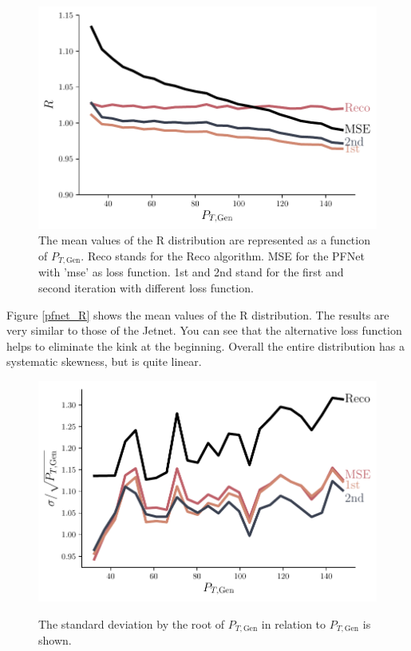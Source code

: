 \documentclass[12pt, a4paper]{thesis}
\begin{document}
\begin{figure}[htbp]
\centering
\includegraphics[width=.9\linewidth]{../images/pfnet_R.pdf}
\caption{\label{fig:orgfd0f576}
The mean values of the R distribution are represented as a function of \(P_{T, \text{Gen}}\). Reco stands for the Reco algorithm. MSE for the PFNet with 'mse' as loss function. 1st and 2nd stand for the first and second iteration with different loss function.}
\end{figure}

Figure \ref{pfnet_R} shows the mean values of the R
distribution. The results are very similar to those of the Jetnet. You
can see that the alternative loss function helps to eliminate the kink
at the beginning.  Overall the entire distribution has a systematic
skewness, but is quite linear.

\begin{figure}[htbp]
\centering
\includegraphics[width=.9\linewidth]{../images/pfnet_res.pdf}
\label{fig:orgdedc16a}
\caption{The standard deviation by the root of \(P_{T, \text{Gen}}\)
in relation to \(P_{T, \text{Gen}}\) is shown.}
\end{figure} 
\end{document}
